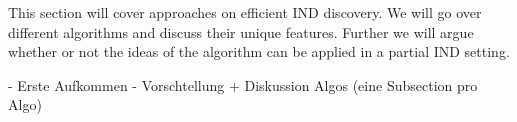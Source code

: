 
This section will cover approaches on efficient IND discovery. We will go over different algorithms and discuss their unique features. Further we will argue whether or not the ideas of the algorithm can be applied in a partial IND setting.



- Erste Aufkommen
- Vorschtellung + Diskussion Algos (eine Subsection pro Algo)